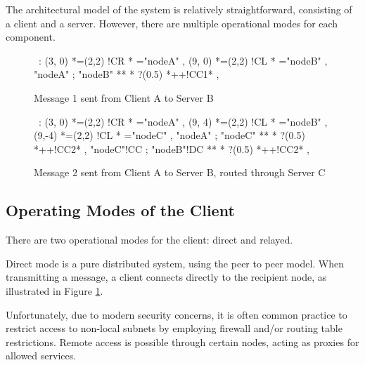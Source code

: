 
The architectural model of the system is relatively straightforward,
consisting of a client and a server. However, there are multiple
operational modes for each component.

\begin{figure}[ht]

\begin{center}
\ \xy<1cm,0cm>:
(3, 0) *=(2,2) !CR  *\frm{-} ="nodeA" , 
(9, 0) *=(2,2) !CL  *\frm{=} ="nodeB" , 
"nodeA" ; "nodeB" **\dir{-} *\dir{>} ?(0.5) *++!CC{1}* , 
\endxy
\end{center}

\label{fig:client}

\caption{Message 1 sent from Client A to Server B}

\end{figure}

\begin{figure}[ht]

\begin{center}
\ \xy<1cm,0cm>:
(3, 0) *=(2,2) !CR  *\frm{-} ="nodeA" , 
(9, 4) *=(2,2) !CL  *\frm{=} ="nodeB" , 
(9,-4) *=(2,2) !CL  *\frm{=} ="nodeC" , 
"nodeA" ; "nodeC" **\dir{-} *\dir{>} ?(0.5) *++!CC{2}* , 
"nodeC"!CC ; "nodeB"!DC **\dir{-} *\dir{>} ?(0.5) *++!CC{2}* , 
\endxy
\end{center}

\caption{Message 2 sent from Client A to Server B, routed through Server C}

\label{fig:relay}

\end{figure}

\subsection{Operating Modes of the Client}

There are two operational modes for the client: direct and relayed.

Direct mode is a pure distributed system, using the peer to peer model.
When transmitting a message, a client connects directly to the
recipient node, as illustrated in Figure \ref{fig:client}.


Unfortunately, due to modern security concerns, it is often common 
practice to restrict access to non-local subnets by employing firewall
and/or routing table restrictions. Remote access is possible through
certain nodes, acting as proxies for allowed services. 


